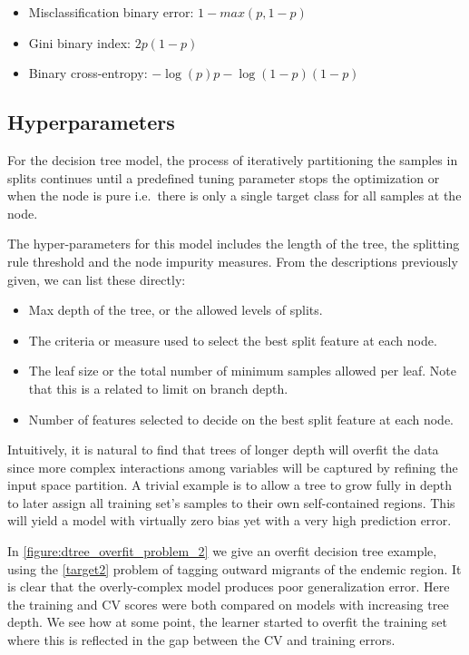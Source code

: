 \begin{itemize}
\item Misclassification binary error: $1 - max(p, 1-p)$ \label{it:decisionTreeCostFunctions}
\item Gini binary index: $ 2p(1-p) $
\item Binary cross-entropy: $ -\log(p)p - \log(1- p)(1-p) $
\end{itemize}


\subsection{Hyperparameters}\label{subsection:decision_trees_hyperparameters}

For the decision tree model, the process of iteratively partitioning the samples in splits continues until a predefined tuning parameter stops the optimization or when the node is pure i.e.\ there is only a single target class for all samples at the node.

The hyper-parameters for this model includes the length of the tree, the splitting rule threshold and the node impurity measures.
From the descriptions previously given, we can list these directly:

\begin{itemize}
\item Max depth of the tree, or the allowed levels of splits.
\item The criteria or measure used to select the best split feature at each node.
\item The leaf size or the total number of minimum samples allowed per leaf.
Note that this is a related to limit on branch depth.
\item Number of features selected to decide on the best split feature at each node.
\end{itemize}


Intuitively, it is natural to find that trees of longer depth will overfit the data since more complex interactions among variables will be captured by refining the input space partition.
A trivial example is to allow a tree to grow fully in depth to later assign all training set's samples to their own self-contained regions.
This will yield a model with virtually zero bias yet with a very high prediction error.

In \cref{figure:dtree_overfit_problem_2} we give an overfit decision tree example, using the  \cref{target2} problem of tagging outward migrants of the endemic region.
It is clear that the overly-complex model produces poor generalization error.
Here the training and CV scores were both compared on models with increasing tree depth.
We see how at some point, the learner started to overfit the training set where this is reflected in the gap between the CV and training errors.

